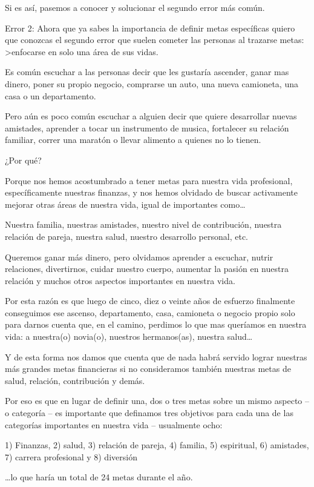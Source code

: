 \documentclass[12pt]{book}
\begin{document}
Si es así, pasemos a conocer y solucionar el segundo error más común.

Error 2:
Ahora que ya sabes la importancia de definir metas específicas quiero que conozcas el segundo error que suelen cometer las personas al trazarse metas: >enfocarse en solo una área de sus vidas.

Es común escuchar a las personas decir que les gustaría ascender, ganar mas dinero, poner su propio negocio, comprarse un auto, una nueva camioneta, una casa o un departamento.

Pero aún es poco común escuchar a alguien decir que quiere desarrollar nuevas amistades, aprender a tocar un instrumento de musica, fortalecer su relación familiar, correr una maratón o llevar alimento a quienes no lo tienen.

¿Por qué?

Porque nos hemos acostumbrado a tener metas para nuestra vida profesional, específicamente nuestras finanzas, y nos hemos olvidado de buscar activamente mejorar otras áreas de nuestra vida, igual de importantes como…

Nuestra familia, nuestras amistades, nuestro nivel de contribución, nuestra relación de pareja, nuestra salud, nuestro desarrollo personal, etc.

Queremos ganar más dinero, pero olvidamos aprender a escuchar, nutrir relaciones, divertirnos, cuidar nuestro cuerpo, aumentar la pasión en nuestra relación y muchos otros aspectos importantes en nuestra vida.

Por esta razón es que luego de cinco, diez o veinte años de esfuerzo finalmente conseguimos ese ascenso, departamento, casa, camioneta o negocio propio solo para darnos cuenta que, en el camino, perdimos lo que mas queríamos en nuestra vida: a nuestra(o) novia(o), nuestros hermanos(as), nuestra salud…

Y de esta forma nos damos que cuenta que de nada habrá servido lograr nuestras más grandes metas financieras si no consideramos también nuestras metas de salud, relación, contribución y demás.

Por eso es que en lugar de definir una, dos o tres metas sobre un mismo aspecto – o categoría – es importante que definamos tres objetivos para cada una de las categorías importantes en nuestra vida – usualmente ocho:

1) Finanzas, 2) salud, 3) relación de pareja, 4) familia, 5) espiritual, 6) amistades, 7) carrera profesional y 8) diversión

…lo que haría un total de 24 metas durante el año.
\end{document}
